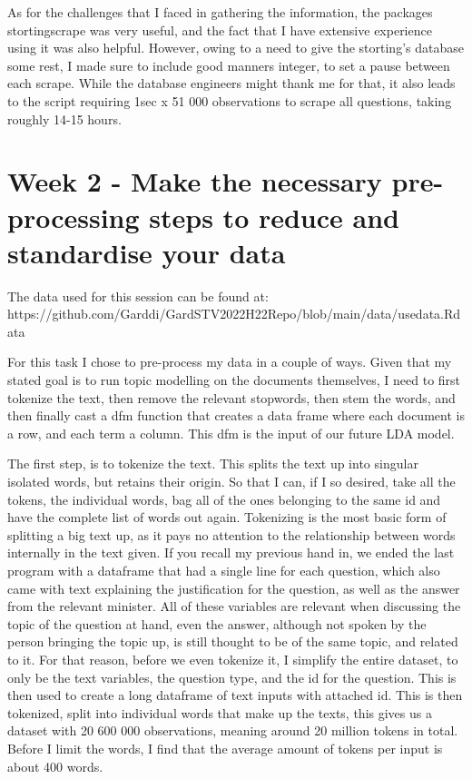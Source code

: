 \documentclass[12pt]{article}
\begin{document}
	As for the challenges that I faced in gathering the information, the packages stortingscrape was very useful, and the fact that I have extensive experience using it was also helpful. However, owing to a need to give the storting's database some rest, I made sure to include good manners integer, to set a pause between each scrape. While the database engineers might thank me for that, it also leads to the script requiring 1sec x 51 000 observations to scrape all questions, taking roughly 14-15 hours. 
	
	\section{ Week 2 - Make the necessary pre-processing steps to reduce and standardise your data}
	
	The data used for this session can be found at: \\ https://github.com/Garddi/GardSTV2022H22Repo/blob/main/data/usedata.Rdata 
	
	For this task I chose to pre-process my data in a couple of ways. Given that my stated goal is to run topic modelling on the documents themselves, I need to first tokenize the text, then remove the relevant stopwords, then stem the words, and then finally cast a dfm function that creates a data frame where each document is a row, and each term a column. This dfm is the input of our future LDA model. 
	
	The first step, is to tokenize the text. This splits the text up into singular isolated words, but retains their origin. So that I can, if I so desired, take all the tokens, the individual words, bag all of the ones belonging to the same id and have the complete list of words out again. Tokenizing is the most basic form of splitting a big text up, as it pays no attention to the relationship between words internally in the text given. If you recall my previous hand in, we ended the last program with a dataframe that had a single line for each question, which also came with text explaining the justification for the question, as well as the answer from the relevant minister. All of these variables are relevant when discussing the topic of the question at hand, even the answer, although not spoken by the person bringing the topic up, is still thought to be of the same topic, and related to it. For that reason, before we even tokenize it, I simplify the entire dataset, to only be the text variables, the question type, and the id for the question. This is then used to create a long dataframe of text inputs with attached id. This is then tokenized, split into individual words that make up the texts, this gives us a dataset with 20 600 000 observations, meaning around 20 million tokens in total. Before I limit the words, I find that the average amount of tokens per input is about 400 words. 
	
\end{document}
